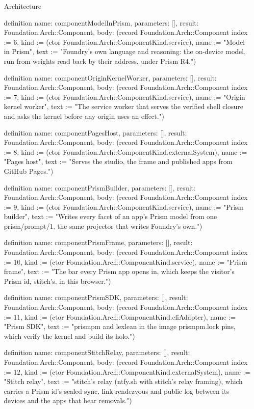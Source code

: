 \begin{lexlean}{Architecture}
\begin{semanticmodule}
definition{
  name: componentModelInPrism,
  parameters: [],
  result: Foundation.Arch::Component,
  body: (record Foundation.Arch::Component {index := 6, kind := (ctor Foundation.Arch::ComponentKind.service), name := "Model in Prism", text := "Foundry's own language and reasoning: the on-device model, run from weights read back by their address, under Prism R4."})
}

definition{
  name: componentOriginKernelWorker,
  parameters: [],
  result: Foundation.Arch::Component,
  body: (record Foundation.Arch::Component {index := 7, kind := (ctor Foundation.Arch::ComponentKind.service), name := "Origin kernel worker", text := "The service worker that serves the verified shell closure and asks the kernel before any origin uses an effect."})
}

definition{
  name: componentPagesHost,
  parameters: [],
  result: Foundation.Arch::Component,
  body: (record Foundation.Arch::Component {index := 8, kind := (ctor Foundation.Arch::ComponentKind.externalSystem), name := "Pages host", text := "Serves the studio, the frame and published apps from GitHub Pages."})
}

definition{
  name: componentPrismBuilder,
  parameters: [],
  result: Foundation.Arch::Component,
  body: (record Foundation.Arch::Component {index := 9, kind := (ctor Foundation.Arch::ComponentKind.service), name := "Prism builder", text := "Writes every facet of an app's Prism model from one prism/prompt/1, the same projector that writes Foundry's own."})
}

definition{
  name: componentPrismFrame,
  parameters: [],
  result: Foundation.Arch::Component,
  body: (record Foundation.Arch::Component {index := 10, kind := (ctor Foundation.Arch::ComponentKind.service), name := "Prism frame", text := "The bar every Prism app opens in, which keeps the visitor's Prism id, stitch's, in this browser."})
}

definition{
  name: componentPrismSDK,
  parameters: [],
  result: Foundation.Arch::Component,
  body: (record Foundation.Arch::Component {index := 11, kind := (ctor Foundation.Arch::ComponentKind.cliAdapter), name := "Prism SDK", text := "prismpm and lexlean in the image prismpm.lock pins, which verify the kernel and build its holo."})
}

definition{
  name: componentStitchRelay,
  parameters: [],
  result: Foundation.Arch::Component,
  body: (record Foundation.Arch::Component {index := 12, kind := (ctor Foundation.Arch::ComponentKind.externalSystem), name := "Stitch relay", text := "stitch's relay (ntfy.sh with stitch's relay framing), which carries a Prism id's sealed sync, link rendezvous and public log between its devices and the apps that hear removals."})
}


\end{semanticmodule}
\end{lexlean}
